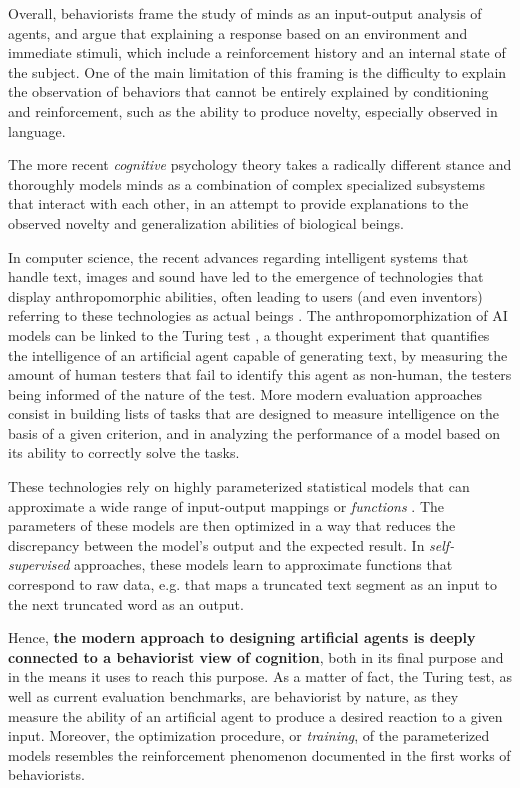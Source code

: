 Overall, behaviorists frame the study of minds as an input-output analysis of agents, and argue that explaining a response based on an environment and immediate stimuli, which include a reinforcement history and an internal state of the subject. One of the main limitation of this framing is the difficulty to explain the observation of behaviors that cannot be entirely explained by conditioning and reinforcement, such as the ability to produce novelty, especially observed in language.

The more recent \textit{cognitive} psychology theory takes a radically different stance and thoroughly models minds as a combination of complex specialized subsystems that interact with each other, in an attempt to provide explanations to the observed novelty and generalization abilities of biological beings.

In computer science, the recent advances regarding intelligent systems that handle text, images and sound have led to the emergence of technologies that display anthropomorphic abilities, often leading to users (and even inventors) referring to these technologies as actual beings \citep{anthropo}. The anthropomorphization of AI models can be linked to the Turing test \citep{turing1950computing}, a thought experiment that quantifies the intelligence of an artificial agent capable of generating text, by measuring the amount of human testers that fail to identify this agent as non-human, the testers being informed of the nature of the test. More modern evaluation approaches consist in building lists of tasks that are designed to measure intelligence on the basis of a given criterion, and in analyzing the performance of a model based on its ability to correctly solve the tasks.

These technologies rely on highly parameterized statistical models that can approximate a wide range of input-output mappings or \textit{functions} \citep{HORNIK1990551}. The parameters of these models are then optimized in a way that reduces the discrepancy between the model's output and the expected result. In \textit{self-supervised} approaches, these models learn to approximate functions that correspond to raw data, e.g. that maps a truncated text segment as an input to the next truncated word as an output.

Hence, \textbf{the modern approach to designing artificial agents is deeply connected to a behaviorist view of cognition}, both in its final purpose and in the means it uses to reach this purpose. As a matter of fact, the Turing test, as well as current evaluation benchmarks, are behaviorist by nature, as they measure the ability of an artificial agent to produce a desired reaction to a given input. Moreover, the optimization procedure, or \textit{training}, of the parameterized models resembles the reinforcement phenomenon documented in the first works of behaviorists.

